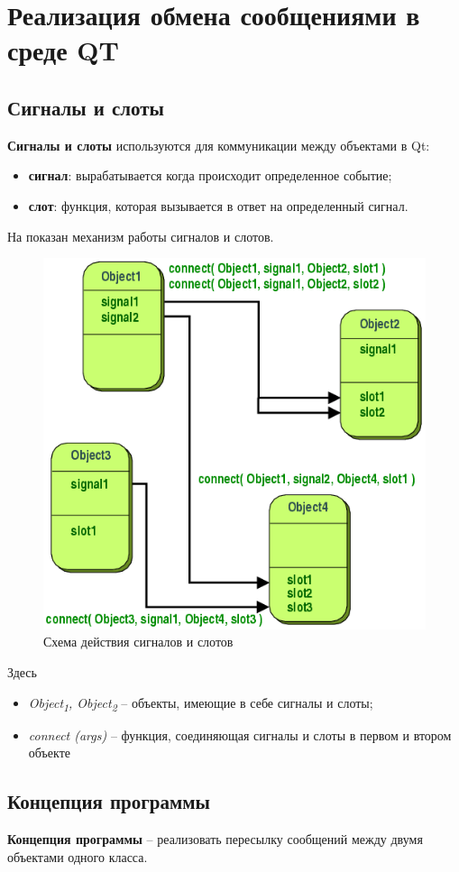 \documentclass[../AISTR.tex]{subfiles}
\begin{document}
\section{Реализация обмена сообщениями в среде QT}
\subsection{Сигналы и слоты}
\textbf{Сигналы и слоты} используются для коммуникации между объектами в Qt: 
\begin{itemize}
	\item \textbf{сигнал}: вырабатывается когда происходит определенное событие;
	\item \textbf{слот}: функция, которая вызывается в ответ на определенный сигнал.
\end{itemize}
На  показан механизм работы сигналов и слотов. 
\begin{figure}[h]
	\centering
	\includegraphics[width=0.7\linewidth]{../images/signal-slot}
	\caption{Схема действия сигналов и слотов}
	\label{fig:signal-slot}
\end{figure}
Здесь
\begin{itemize}
	\item \textit{Object\textsubscript{1}, Object\textsubscript{2}} -- объекты, имеющие в себе сигналы и слоты; 
	\item \textit{connect (args)} -- функция, соединяющая сигналы и слоты в первом и втором объекте
\end{itemize}

\subsection{Концепция программы}
\textbf{Концепция программы} -- реализовать пересылку сообщений между двумя объектами одного класса. 
\end{document}

